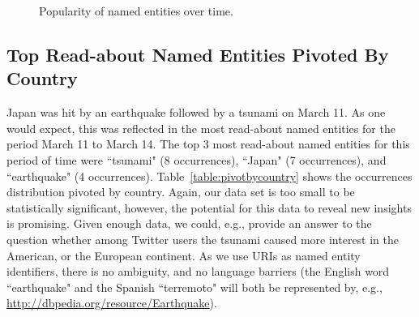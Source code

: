 \documentclass[runningheads,a4paper]{llncs}
\begin{document}
\begin{figure}[ht!]
  \begin{center}
  \end{center}
  \caption{Popularity of named entities over time.}
  \label{fig:overtime}
\end{figure}

\subsection{Top Read-about Named Entities Pivoted By Country}
Japan was hit by an earthquake followed by a tsunami on March 11. As one would expect, this was reflected in the most read-about named entities for the period March 11 to March 14. The top 3 most read-about named entities for this period of time were ``tsunami" (8 occurrences), ``Japan" (7 occurrences), and ``earthquake" (4 occurrences). Table~\ref{table:pivotbycountry} shows the occurrences distribution pivoted by country. Again, our data set is too small to be statistically significant, however, the potential for this data to reveal new insights is promising. Given enough data, we could, e.g., provide an answer to the question whether among Twitter users the tsunami caused more interest in the American, or the European continent. As we use URIs as named entity identifiers, there is no ambiguity, and no language barriers (the English word ``earthquake" and the Spanish ``terremoto" will both be represented by, e.g., \url{http://dbpedia.org/resource/Earthquake}).
\end{document}
